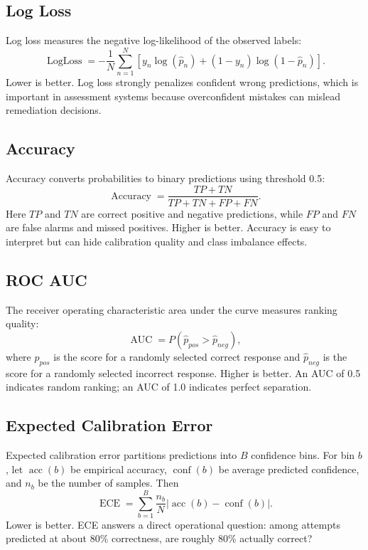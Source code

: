 \documentclass[conference]{IEEEtran}
\begin{document}
\subsection{Log Loss}
Log loss measures the negative log-likelihood of the observed labels:
\begin{equation}
\operatorname{LogLoss}=-\frac{1}{N}\sum_{n=1}^{N}
\left[y_n\log(\hat{p}_n)+(1-y_n)\log(1-\hat{p}_n)\right].
\end{equation}
Lower is better. Log loss strongly penalizes confident wrong predictions, which is important in assessment systems because overconfident mistakes can mislead remediation decisions.

\subsection{Accuracy}
Accuracy converts probabilities to binary predictions using threshold 0.5:
\begin{equation}
\operatorname{Accuracy}=
\frac{TP+TN}{TP+TN+FP+FN}.
\end{equation}
Here $TP$ and $TN$ are correct positive and negative predictions, while $FP$ and $FN$ are false alarms and missed positives. Higher is better. Accuracy is easy to interpret but can hide calibration quality and class imbalance effects.

\subsection{ROC AUC}
The receiver operating characteristic area under the curve measures ranking quality:
\begin{equation}
\operatorname{AUC}=P(\hat{p}_{pos}>\hat{p}_{neg}),
\end{equation}
where $\hat{p}_{pos}$ is the score for a randomly selected correct response and $\hat{p}_{neg}$ is the score for a randomly selected incorrect response. Higher is better. An AUC of 0.5 indicates random ranking; an AUC of 1.0 indicates perfect separation.

\subsection{Expected Calibration Error}
Expected calibration error partitions predictions into $B$ confidence bins. For bin $b$, let $\operatorname{acc}(b)$ be empirical accuracy, $\operatorname{conf}(b)$ be average predicted confidence, and $n_b$ be the number of samples. Then
\begin{equation}
\operatorname{ECE}=\sum_{b=1}^{B}\frac{n_b}{N}
\left|\operatorname{acc}(b)-\operatorname{conf}(b)\right|.
\end{equation}
Lower is better. ECE answers a direct operational question: among attempts predicted at about 80\% correctness, are roughly 80\% actually correct?
\end{document}
